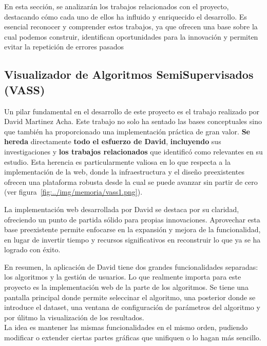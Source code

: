 En esta sección, se analizarán los trabajos relacionados con el proyecto, destacando cómo cada uno de ellos ha influido y enriquecido el desarrollo. Es esencial reconocer y comprender estos trabajos, ya que ofrecen una base sobre la cual podemos construir, identifican oportunidades para la innovación y permiten evitar la repetición de errores pasados
\subsection{Visualizador de Algoritmos SemiSupervisados (VASS)}
Un pilar fundamental en el desarrollo de este proyecto es el trabajo realizado por David Martinez Acha. Este trabajo no solo ha sentado las bases conceptuales sino que también ha proporcionado una implementación práctica de gran valor. \textbf{Se hereda} directamente \textbf{todo el esfuerzo de David}, \textbf{incluyendo} sus investigaciones y \textbf{los trabajos relacionados} que identificó como relevantes en su estudio. Esta herencia es particularmente valiosa en lo que respecta a la implementación de la web, donde la infraestructura y el diseño preexistentes ofrecen una plataforma robusta desde la cual se puede avanzar sin partir de cero (ver figura~\ref{fig:../img/memoria/vass1.png}).

La implementación web desarrollada por David se destaca por su claridad, ofreciendo un punto de partida sólido para propias innovaciones. Aprovechar esta base preexistente permite enfocarse en la expansión y mejora de la funcionalidad, en lugar de invertir tiempo y recursos significativos en reconstruir lo que ya se ha logrado con éxito.

En resumen, la aplicación de David tiene dos grandes funcionalidades separadas: los algoritmos y la gestión de usuarios. Lo que realmente importa para este proyecto es la implementación web de la parte de los algoritmos. Se tiene una pantalla principal donde permite seleccinar el algoritmo, una posterior donde se introduce el dataset, una ventana de configuración de parámetros del algoritmo y por úlitmo la visualización de los resultados.\\
La idea es mantener las mismas funcionalidades en el mismo orden, pudiendo modificar o extender ciertas partes gráficas que unifiquen o lo hagan más sencillo.

